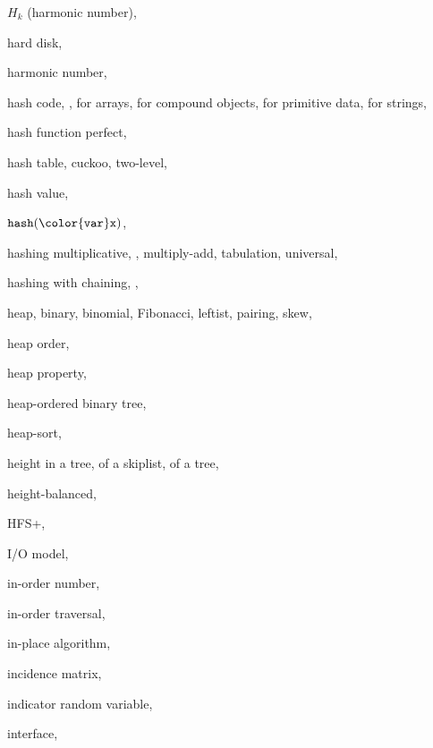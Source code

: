 \documentclass[10pt]{book}
\theoremstyle{plain}
\theoremstyle{definition}
\begin{document}
\begin{theindex}
  \item $H_k$ (harmonic number), 
  \item hard disk, 
  \item harmonic number, 
  \item hash code, , 
    \subitem for arrays, 
    \subitem for compound objects, 
    \subitem for primitive data, 
    \subitem for strings, 
  \item hash function
    \subitem perfect, 
  \item hash table, 
    \subitem cuckoo, 
    \subitem two-level, 
  \item hash value, 
  \item \ensuremath{\mathtt{hash({\color{var}x})}}, 
  \item hashing
    \subitem multiplicative, , 
    \subitem multiply-add, 
    \subitem tabulation, 
    \subitem universal, 
  \item hashing with chaining, , 
  \item heap, 
    \subitem binary, 
    \subitem binomial, 
    \subitem Fibonacci, 
    \subitem leftist, 
    \subitem pairing, 
    \subitem skew, 
  \item heap order, 
  \item heap property, 
  \item heap-ordered binary tree, 
  \item heap-sort, 
  \item height
    \subitem in a tree, 
    \subitem of a skiplist, 
    \subitem of a tree, 
  \item height-balanced, 
  \item HFS+, 

  \indexspace

  \item I/O model, 
  \item in-order number, 
  \item in-order traversal, 
  \item in-place algorithm, 
  \item incidence matrix, 
  \item indicator random variable, 
  \item interface, 


\end{theindex}
\end{document}
